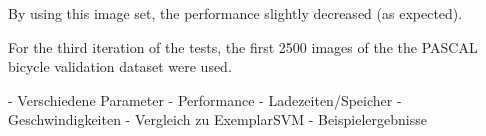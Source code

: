 By using this image set, the performance slightly decreased (as expected). 

For the third iteration of the tests, the first 2500 images of the the \ac{PASCAL} bicycle validation dataset were used. 

- Verschiedene Parameter
- Performance
- Ladezeiten/Speicher
- Geschwindigkeiten
- Vergleich zu ExemplarSVM
- Beispielergebnisse
